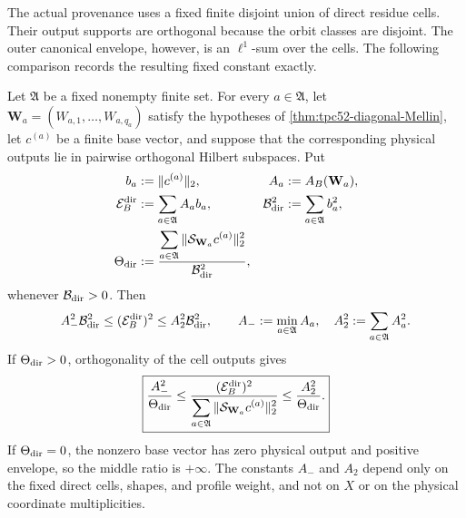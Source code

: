 The actual provenance uses a fixed finite disjoint union of direct
residue cells.  Their output supports are orthogonal because the orbit
classes are disjoint.  The outer canonical envelope, however, is an
\(\ell^1\)-sum over the cells.  The following comparison records the
resulting fixed constant exactly.

\begin{corollary}
\label{cor:tpc52-finite-direct-cell-comparison}
Let \(\mathfrak A\) be a fixed nonempty finite set.  For every
\(a\in\mathfrak A\), let
\(\mathbf W_a=(W_{a,1},\ldots,W_{a,q_a})\) satisfy the hypotheses of
\cref{thm:tpc52-diagonal-Mellin}, let \(c^{(a)}\) be a finite base
vector, and suppose that the corresponding physical outputs lie in
pairwise orthogonal Hilbert subspaces.  Put
\begin{align}
 b_a&:=\|c^{(a)}\|_2,
 &A_a&:=A_B(\mathbf W_a),
 \label{eq:tpc52-direct-cell-base-data}\\
 \mathcal E_B^{\rm dir}
 &:=\sum_{a\in\mathfrak A}A_ab_a,
 &\mathcal B_{\rm dir}^2
 &:=\sum_{a\in\mathfrak A}b_a^2,
 \label{eq:tpc52-direct-cell-envelope}\\
 \Theta_{\rm dir}
 &:=\frac{
   \displaystyle\sum_{a\in\mathfrak A}
       \|\mathcal S_{\mathbf W_a}c^{(a)}\|_2^2}
   {\mathcal B_{\rm dir}^2},
 \label{eq:tpc52-direct-cell-overlap}
\end{align}
whenever \(\mathcal B_{\rm dir}>0\).  Then
\begin{equation}
 A_-^2\mathcal B_{\rm dir}^2
 \leq (\mathcal E_B^{\rm dir})^2
 \leq A_2^2\mathcal B_{\rm dir}^2,
 \qquad
 A_-:=\min_{a\in\mathfrak A}A_a,
 \quad
 A_2^2:=\sum_{a\in\mathfrak A}A_a^2.
 \label{eq:tpc52-direct-cell-envelope-comparison}
\end{equation}
If \(\Theta_{\rm dir}>0\), orthogonality of the cell outputs gives
\begin{equation}
 \boxed{
 \frac{A_-^2}{\Theta_{\rm dir}}
 \leq
 \frac{(\mathcal E_B^{\rm dir})^2}
      {\displaystyle\sum_{a\in\mathfrak A}
       \|\mathcal S_{\mathbf W_a}c^{(a)}\|_2^2}
 \leq
 \frac{A_2^2}{\Theta_{\rm dir}}.}
 \label{eq:tpc52-finite-cell-Theta-ledger}
\end{equation}
If \(\Theta_{\rm dir}=0\), the nonzero base vector has zero physical
output and positive envelope, so the middle ratio is \(+\infty\).
The constants \(A_-\) and \(A_2\) depend only on the fixed direct
cells, shapes, and profile weight, and not on \(X\) or on the physical
coordinate multiplicities.
\end{corollary}

